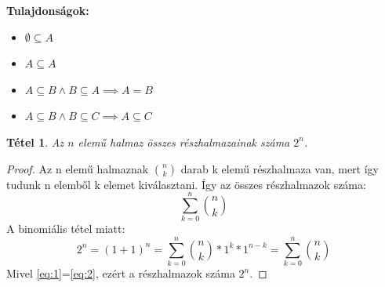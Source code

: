 \documentclass[twoside,12pt]{report}
\newtheorem{theorem}{Tétel}[section]
\theoremstyle{definition}
\begin{document}
	\noindent
	\textbf{Tulajdonságok:}
	\begin{itemize}
		\item $\emptyset\subseteq A$
		\item $A\subseteq A$
		\item $A\subseteq B \wedge B\subseteq A \implies A=B $
		\item $A\subseteq B \wedge B\subseteq C \implies A\subseteq C$
	\end{itemize}
	\begin{theorem}
		Az $n$ elemű halmaz összes részhalmazainak száma $2^n$.
	\end{theorem}
	\begin{proof}
		Az n elemű halmaznak $\binom{n}{k}$ darab k elemű részhalmaza van, mert így tudunk n elemből k elemet kiválasztani. Így az összes részhalmazok száma:
		\begin{equation}
			\sum_{k=0}^{n}\binom{n}{k}\label{eq:1}
		\end{equation}	
		A binomiális tétel miatt:
		\begin{equation}
			2^n=(1+1)^n=\sum_{k=0}^{n}\binom{n}{k}*1^k*1^{n-k}=\sum_{k=0}^n \binom{n}{k}\label{eq:2}
		\end{equation}
		Mivel \eqref{eq:1}=\eqref{eq:2}, ezért a részhalmazok száma $2^n$.
	\end{proof}
\end{document}
